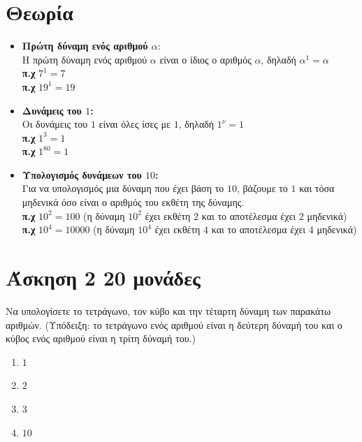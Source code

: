 \documentclass[a4paper,10pt]{report}
\begin{document}
\section*{Θεωρία   \hfill \small{}}
\begin{itemize}
 \item \textbf{Πρώτη δύναμη ενός αριθμού $α$}: \\
        Η πρώτη δύναμη ενός αριθμού $α$ είναι ο ίδιος ο αριθμός $α$, δηλαδή $α^{1}=α$\\
        \textbf{π.χ} $7^{1}=7$\\
        \textbf{π.χ} $19^{1}=19$
 \item \textbf{Δυνάμεις του $1$: }\\ 
        Οι δυνάμεις του $1$ είναι όλες ίσες με $1$, δηλαδή $1^{ν}=1$\\
       \textbf{π.χ} $1^{3}=1$ \\
       \textbf{π.χ} $1^{80}=1$ 
 \item \textbf{Υπολογισμός δυνάμεων του $10$:}\\ 
       Για να υπολογισμός μια δύναμη που έχει βάση το $10$, βάζουμε το $1$ και τόσα μηδενικά  όσο 
είναι ο αριθμός του  εκθέτη της δύναμης.  \\
       \textbf{π.χ} $10^{2}=100$ (η δύναμη $10^{2}$ έχει εκθέτη $2$ και το αποτέλεσμα έχει $2$ μηδενικά)\\
       \textbf{π.χ} $10^{4}=10000$ (η δύναμη $10^{4}$ έχει εκθέτη $4$ και το αποτέλεσμα έχει $4$ μηδενικά)
\end{itemize}







\section*{Άσκηση 2  \hfill \small{20 μονάδες}}
Να υπολογίσετε το τετράγωνο, τον κύβο και την τέταρτη δύναμη των παρακάτω αριθμών. 
(Υπόδειξη: το τετράγωνο ενός αριθμού είναι η δεύτερη δύναμή του και ο κύβος ενός αριθμού είναι η τρίτη δύναμή του.)
\begin{enumerate}[1)]
 \item $1$
 \item $2$
 \item $3$
 \item $10$ 
\end{enumerate}
\end{document}
